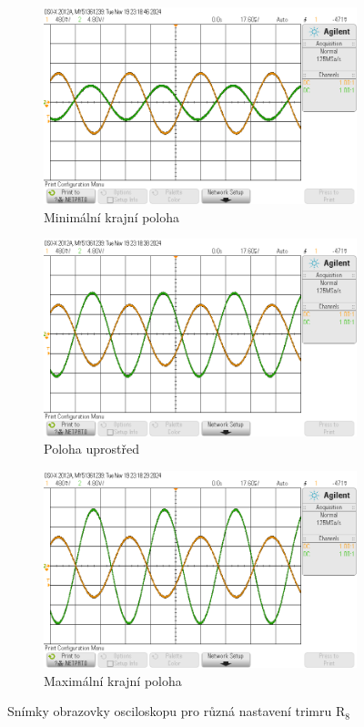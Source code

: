 \documentclass[a4paper, czech]{article}
\begin{document}
\begin{figure}[H]
    \centering
    \begin{subfigure}{0.49\textwidth}
        \includegraphics[width=\textwidth]{osc_min.png}
        \caption{Minimální krajní poloha}
    \end{subfigure}
    \hfill
    \begin{subfigure}{0.49\textwidth}
        \includegraphics[width=\textwidth]{osc_mid.png}
        \caption{Poloha uprostřed}
    \end{subfigure}

    \begin{subfigure}{0.49\textwidth}
        \includegraphics[width=\textwidth]{osc_max.png}
        \caption{Maximální krajní poloha}
    \end{subfigure}
    \caption{Snímky obrazovky osciloskopu pro různá nastavení trimru $\text{R}_8$} 
\end{figure}
\end{document}
